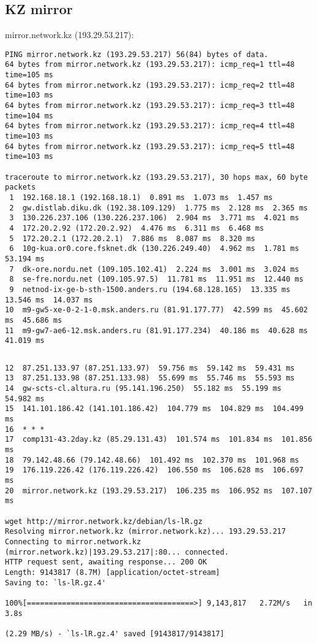 \documentclass{acm_proc_article-sp}
\begin{document}
\subsection{KZ mirror} 
mirror.network.kz (193.29.53.217):
\begin{verbatim}
PING mirror.network.kz (193.29.53.217) 56(84) bytes of data.
64 bytes from mirror.network.kz (193.29.53.217): icmp_req=1 ttl=48 time=105 ms
64 bytes from mirror.network.kz (193.29.53.217): icmp_req=2 ttl=48 time=103 ms
64 bytes from mirror.network.kz (193.29.53.217): icmp_req=3 ttl=48 time=104 ms
64 bytes from mirror.network.kz (193.29.53.217): icmp_req=4 ttl=48 time=103 ms
64 bytes from mirror.network.kz (193.29.53.217): icmp_req=5 ttl=48 time=103 ms

traceroute to mirror.network.kz (193.29.53.217), 30 hops max, 60 byte packets
 1  192.168.18.1 (192.168.18.1)  0.891 ms  1.073 ms  1.457 ms
 2  gw.distlab.diku.dk (192.38.109.129)  1.775 ms  2.128 ms  2.365 ms
 3  130.226.237.106 (130.226.237.106)  2.904 ms  3.771 ms  4.021 ms
 4  172.20.2.92 (172.20.2.92)  4.476 ms  6.311 ms  6.468 ms
 5  172.20.2.1 (172.20.2.1)  7.886 ms  8.087 ms  8.320 ms
 6  10g-kua.or0.core.fsknet.dk (130.226.249.40)  4.962 ms  1.781 ms  53.194 ms
 7  dk-ore.nordu.net (109.105.102.41)  2.224 ms  3.001 ms  3.024 ms
 8  se-fre.nordu.net (109.105.97.5)  11.781 ms  11.951 ms  12.440 ms
 9  netnod-ix-ge-b-sth-1500.anders.ru (194.68.128.165)  13.335 ms  13.546 ms  14.037 ms
10  m9-gw5-xe-0-2-1-0.msk.anders.ru (81.91.177.77)  42.599 ms  45.602 ms  45.686 ms
11  m9-gw7-ae6-12.msk.anders.ru (81.91.177.234)  40.186 ms  40.628 ms  41.019 ms
\end{verbatim}
\newpage
$ $
\newpage
\begin{verbatim}
12  87.251.133.97 (87.251.133.97)  59.756 ms  59.142 ms  59.431 ms
13  87.251.133.98 (87.251.133.98)  55.699 ms  55.746 ms  55.593 ms
14  gw-scts-cl.altura.ru (95.141.196.250)  55.182 ms  55.199 ms  54.982 ms
15  141.101.186.42 (141.101.186.42)  104.779 ms  104.829 ms  104.499 ms
16  * * *
17  comp131-43.2day.kz (85.29.131.43)  101.574 ms  101.834 ms  101.856 ms
18  79.142.48.66 (79.142.48.66)  101.492 ms  102.370 ms  101.968 ms
19  176.119.226.42 (176.119.226.42)  106.550 ms  106.628 ms  106.697 ms
20  mirror.network.kz (193.29.53.217)  106.235 ms  106.952 ms  107.107 ms

wget http://mirror.network.kz/debian/ls-lR.gz
Resolving mirror.network.kz (mirror.network.kz)... 193.29.53.217
Connecting to mirror.network.kz (mirror.network.kz)|193.29.53.217|:80... connected.
HTTP request sent, awaiting response... 200 OK
Length: 9143817 (8.7M) [application/octet-stream]
Saving to: `ls-lR.gz.4'

100%[======================================>] 9,143,817   2.72M/s   in 3.8s    

(2.29 MB/s) - `ls-lR.gz.4' saved [9143817/9143817]
\end{verbatim}
\end{document}
